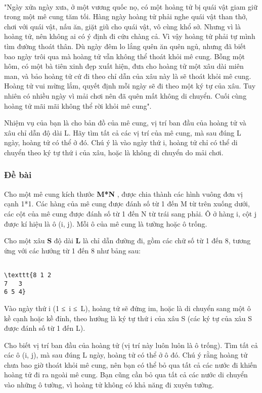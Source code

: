 

 

"Ngày xửa ngày xưa, ở một vương quốc nọ, có một hoàng tử bị quái vật giam giữ trong một mê cung tăm tối. Hàng ngày hoàng tử phải nghe quái vật than thở, chơi với quái vật, nấu ăn, giặt giũ cho quái vật, vô cùng khổ sở. Nhưng vì là hoàng tử, nên không ai có ý định đi cứu chàng cả. Vì vậy hoàng tử phải tự mình tìm đường thoát thân. Dù ngày đêm lo lắng quên ăn quên ngủ, nhưng đã biết bao ngày trôi qua mà hoàng tử vẫn không thể thoát khỏi mê cung. Bỗng một hôm, có một bà tiên xinh đẹp xuất hiện, đưa cho hoàng tử một xâu dài miên man, và bảo hoàng tử cứ đi theo chỉ dẫn của xâu này là sẽ thoát khỏi mê cung. Hoàng tử vui mừng lắm, quyết định mỗi ngày sẽ đi theo một ký tự của xâu. Tuy nhiên có nhiều ngày vì mải chơi nên đã quên mất không di chuyển. Cuối cùng hoàng tử mãi mãi không thể rời khỏi mê cung".

Nhiệm vụ của bạn là cho bản đồ của mê cung, vị trí ban đầu của hoàng tử và xâu chỉ dẫn độ dài L. Hãy tìm tất cả các vị trí của mê cung, mà sau đúng L ngày, hoàng tử có thể ở đó. Chú ý là vào ngày thứ i, hoàng tử chỉ có thể di chuyển theo ký tự thứ i của xâu, hoặc là không di chuyển do mải chơi.

\subsubsection{Đề bài}

Cho một mê cung kích thước \textbf{ M*N } , được chia thành các hình vuông đơn vị cạnh 1*1. Các hàng của mê cung được đánh số từ 1 đến M từ trên xuống dưới, các cột của mê cung được đánh số từ 1 đến N từ trái sang phải. Ô ở hàng i, cột j được kí hiệu là ô (i, j). Mỗi ô của mê cung là tường hoặc ô trống.

Cho một xâu \textbf{ S } độ dài \textbf{ L } là chỉ dẫn đường đi, gồm các chữ số từ 1 đến 8, tương ứng với các hướng từ 1 đến 8 như bảng sau:
\begin{verbatim}

\texttt{8 1 2
7   3
6 5 4}\end{verbatim}

Vào ngày thứ i (1 ≤ i ≤ L), hoàng tử sẽ đứng im, hoặc là di chuyển sang một ô kề cạnh hoặc kề đỉnh, theo hướng là ký tự thứ i của xâu S (các ký tự của xâu S được đánh số từ 1 đến L).

Cho biết vị trí ban đầu của hoàng tử (vị trí này luôn luôn là ô trống). Tìm tất cả các ô (i, j), mà sau đúng L ngày, hoàng tử có thể ở ô đó. Chú ý rằng hoàng tử chưa bao giờ thoát khỏi mê cung, nên bạn có thể bỏ qua tất cả các nước đi khiến hoàng tử đi ra ngoài mê cung. Bạn cũng cần bỏ qua tất cả các nước di chuyển vào những ô tường, vì hoàng tử không có khả năng đi xuyên tường.

